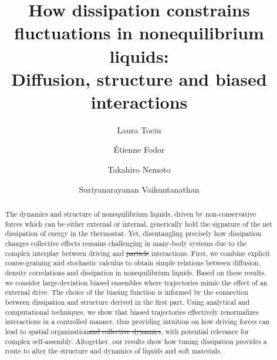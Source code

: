 \documentclass[superscriptaddress, twocolumn, prx, longbibliography, nofootinbib]{revtex4-1}
\providecommand{\DIFaddtex}[1]{{\protect\color{blue}\uwave{#1}}} %
\providecommand{\DIFdeltex}[1]{{\protect\color{red}\sout{#1}}}                      %
\providecommand{\DIFaddbegin}{} %
\providecommand{\DIFaddend}{} %
\providecommand{\DIFdelbegin}{} %
\providecommand{\DIFdelend}{} %
\providecommand{\DIFadd}[1]{\texorpdfstring{\DIFaddtex{#1}}{#1}} %
\providecommand{\DIFdel}[1]{\texorpdfstring{\DIFdeltex{#1}}{}} %
\begin{document}
\title{How dissipation constrains fluctuations in nonequilibrium liquids:\\Diffusion, structure and biased interactions}
\author{Laura Tociu}

\author{\'Etienne Fodor}

\author{Takahiro Nemoto}

\author{Suriyanarayanan Vaikuntanathan}

\begin{abstract}

The dynamics and structure of nonequilibrium liquids, driven by non-conservative forces which can be either external or internal, generically hold the signature of the net dissipation of energy in the thermostat. Yet, disentangling precisely how dissipation changes collective effects remains challenging in many-body systems due to the complex interplay between driving and \DIFdelbegin \DIFdel{particle }\DIFdelend \DIFaddbegin \DIFadd{interparticle }\DIFaddend interactions. First, we combine explicit coarse-graining and stochastic calculus to obtain simple relations between diffusion, density correlations and dissipation in nonequilibrium liquids. Based on these results, we consider large-deviation biased ensembles where trajectories mimic the effect of an external drive. The choice of the biasing function is informed by the connection between dissipation and structure derived in the first part. Using analytical and computational techniques, we show that biased trajectories effectively renormalizes interactions in a controlled manner, thus providing intuition on how driving forces can lead to spatial organization\DIFdelbegin \DIFdel{and collective dynamics}\DIFdelend , with potential relevance for complex self-assembly. Altogether, our results show how tuning dissipation provides a route to alter the structure and dynamics of liquids and soft materials.

\end{abstract}
\end{document}
